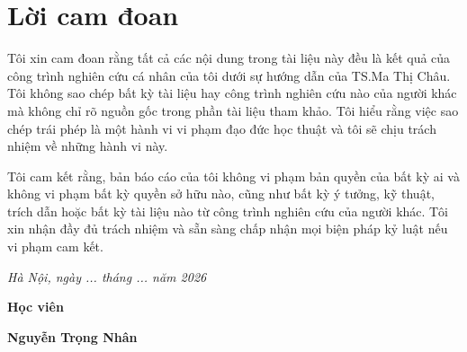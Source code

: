 \clearpage
{}

\chapter*{Lời cam đoan}

Tôi xin cam đoan rằng tất cả các nội dung trong tài liệu này đều là kết quả của công trình nghiên cứu cá nhân của tôi dưới sự hướng dẫn của TS.Ma Thị Châu. Tôi không sao chép bất kỳ tài liệu hay công trình nghiên cứu nào của người khác mà không chỉ rõ nguồn gốc trong phần tài liệu tham khảo. Tôi hiểu rằng việc sao chép trái phép là một hành vi vi phạm đạo đức học thuật và tôi sẽ chịu trách nhiệm về những hành vi này.

Tôi cam kết rằng, bản báo cáo của tôi không vi phạm bản quyền của bất kỳ ai và
không vi phạm bất kỳ quyền sở hữu nào, cũng như bất kỳ ý tưởng, kỹ thuật, trích
dẫn hoặc bất kỳ tài liệu nào từ công trình nghiên cứu của người khác.
Tôi xin nhận đầy đủ trách nhiệm và sẵn sàng chấp nhận mọi biện pháp kỷ luật
nếu vi phạm cam kết.

\vspace{1cm}
\hspace{7cm}\textit{Hà Nội, ngày ... tháng ... năm 2026}

\hspace{9.4cm}\textbf{Học viên}
\vspace{2.5cm}


\hspace{9.3cm}\textbf{Nguyễn Trọng Nhân}

